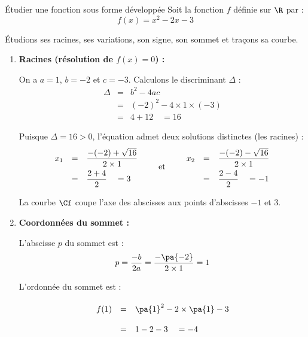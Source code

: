 \begin{methode}{Étudier une fonction sous forme développée}
	Soit la fonction $f$ définie sur $\R$ par :
	\[
		f(x) = x^2 - 2x - 3
	\]

	Étudions ses racines, ses variations, son signe, son sommet et traçons sa courbe.

	\begin{correction}
		\nline
		\begin{enumerate}
			\item \textbf{Racines (résolution de $f(x) = 0$) :}

			      On a $a = 1$, $b = -2$ et $c = -3$. Calculons le discriminant $\Delta$ :
			      \[
				      \begin{array}{rcl}
					      \Delta & = & b^2 - 4ac                       \\
					             & = & (-2)^2 - 4 \times 1 \times (-3) \\
					             & = & 4 + 12 \quad = 16
				      \end{array}
			      \]

			      Puisque $\Delta = 16 > 0$, l'équation admet deux solutions distinctes (les racines) :
			      \[
				      \def\arraystretch{2}
				      \begin{array}{rcl}
					      x_1 & = & \dfrac{-(-2) + \sqrt{16}}{2 \times 1} \\
					          & = & \dfrac{2 + 4}{2} \quad= 3
				      \end{array}
				      \qquad \text{et} \qquad
				      \begin{array}{rcl}
					      x_2 & = & \dfrac{-(-2) - \sqrt{16}}{2 \times 1} \\
					          & = & \dfrac{2 - 4}{2} \quad = -1
				      \end{array}
			      \]

			      La courbe $\Cf$ coupe l'axe des abscisses aux points d'abscisses $-1$ et $3$.

			\item \textbf{Coordonnées du sommet :}

			      L'abscisse $p$ du sommet est :
			      \[
				      p = \dfrac{-b}{2a} = \dfrac{-\pa{-2}}{2 \times 1} = 1
			      \]

			      L'ordonnée du sommet est :
			      \[
				      \begin{array}{rcl}
					      f(1) & = & \pa{1}^2 - 2 \times \pa{1} - 3 \\
					           & = & 1 - 2 - 3 \quad = -4
				      \end{array}
			      \]


\end{enumerate}
\end{correction}
\end{methode}
